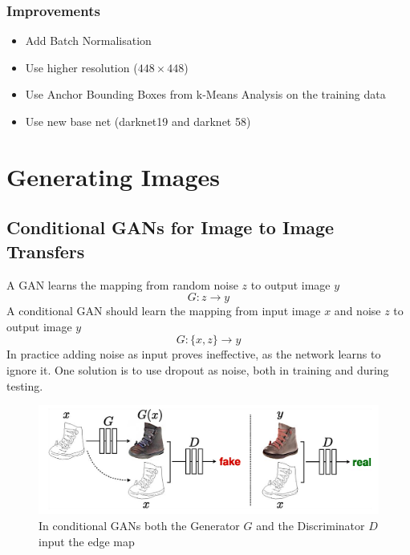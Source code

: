 \documentclass[11pt]{article}
\theoremstyle{definition}
\begin{document}
\subsubsection{Improvements}
\begin{itemize}[label=-]
	\item Add Batch Normalisation
	\item Use higher resolution ($448\times 448$)
	\item Use Anchor Bounding Boxes from k-Means Analysis on the training data
	\item Use new base net (darknet19 and darknet 58)
\end{itemize}

\section{Generating Images}

\subsection{Conditional GANs for Image to Image Transfers}
A GAN learns the mapping from random noise $z$ to output image $y$
\begin{equation*}
	G: z \rightarrow y
\end{equation*}
A conditional GAN should learn the mapping from input image $x$ and noise $z$ to output image $y$
\begin{equation*}
	G: \{x,z\} \rightarrow y
\end{equation*}
In practice adding noise as input proves ineffective, as the network learns to ignore it. One solution is to use dropout as noise, both in training and during testing.
\begin{figure}[H]
	\centering
	\includegraphics[width=0.7\linewidth]{img/conditional_GAN_edge_map}
	\caption{In conditional GANs both the Generator $G$ and the Discriminator $D$ input the edge map}
	\label{fig:conditionalganedgemap}
\end{figure}
\end{document}
